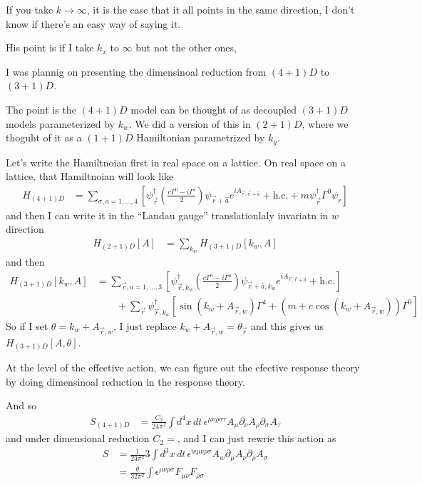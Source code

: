 If you take $k\to\infty$, it is the case that it all points in the same
direction,
I don't know if there's an easy way of saying it.

His point is if I take $k_x$ to $\infty$ but not the other ones,

I was plannig on presenting the dimensinoal reduction from $(4+1)D$
to $(3+1)D$.

The point is the $(4+1)D$ model can be thought of as
decoupled $(3+1)D$ models parameterized by $k_w$.
We did a version of this in $(2+1)D$,
where we thoguht of it as a $(1+1)D$ Hamiltonian parametrized by $k_y$.

Let's write the Hamiltnoian first in real space on a lattice.
On real space on a lattice,
that Hamiltnoian will look like
\begin{align}
    H_{(4+1)D} &=
    \sum_{\sigma,a=1,\ldots,4}\left[ 
    \psi_{\vec{r}}^\dagger
    \left(
    \frac{c\Gamma^0 - i\Gamma^i}{2}
    \right)
    \psi_{\vec{r} + \hat{a}}
    e^{i A_{\vec{r},\vec{r} + \hat{a}}}
    + \mathrm{h.c.}
    + m\psi_{\vec{r}}^\dagger \Gamma^0 \psi_r
    \right]
\end{align}
and then I can write it in the ``Landau gauge''
translationlaly invariatn in $w$ direction
\begin{align}
    H_{(2+1)D}[A] &=
    \sum_{k_w} H_{(3+1)D}[k_w, A]
\end{align}
and then
\begin{align}
    H_{(3+1)D} [k_w, A] &=
    \sum_{\vec{r}, a=1,\ldots,3}\left[ 
    \psi_{\vec{r}, k_w}^\dagger
    \left( 
    \frac{c\Gamma^0 - i\Gamma^a}{2}
    \right)
    \psi_{\vec{r} + \hat{a}, k_w}
    e^{i A_{\vec{r},\vec{r} + \hat{a}}}
    + 
    \mathrm{h.c.}
    \right]\\\nonumber
    &\qquad+
    \sum_{\vec{r}}
    \psi_{\vec{r}, k_w}^\dagger\left[ 
    \sin\left( k_w + A_{\vec{r}, w} \right)\Gamma^4
    +
    \left( m + c\cos\left( k_w + A_{\vec{r},w} \right)\right)\Gamma^0 
    \right]
\end{align}
So if I set $\theta=k_w + A_{\vec{r},w}$,
I just replace $k_w + A_{\vec{r},w} = \theta_{\vec{r}}$
and this gives us
$H_{(3+1)D}[A,\theta]$.

At the level of the effective action,
we can figure out the efective response theory
by doing dimensinoal reduction in the response theory.

And so
\begin{align}
    S_{(4+1)D} &=
    \frac{C_2}{24\pi^2} \int d^4x \, dt\,
    \epsilon^{\mu\nu\rho\sigma\tau}
    A_{\mu} \partial_\nu A_\rho \partial_\sigma A_\tau
\end{align}
and under dimensional reduction $C_2=$,
and I can just rewrie this action as
\begin{align}
    S &=
    \frac{1}{24\pi^2} 3
    \int d^3x \, dt\,
    \epsilon^{w \mu\nu\rho\sigma}
    A_w \partial_\mu A_\nu \partial_\rho A_\sigma\\
    &=
    \frac{\theta}{32\pi^2}
    \int \epsilon^{\mu\nu\rho\sigma} F_{\mu\nu}F_{\rho\sigma}
\end{align}

